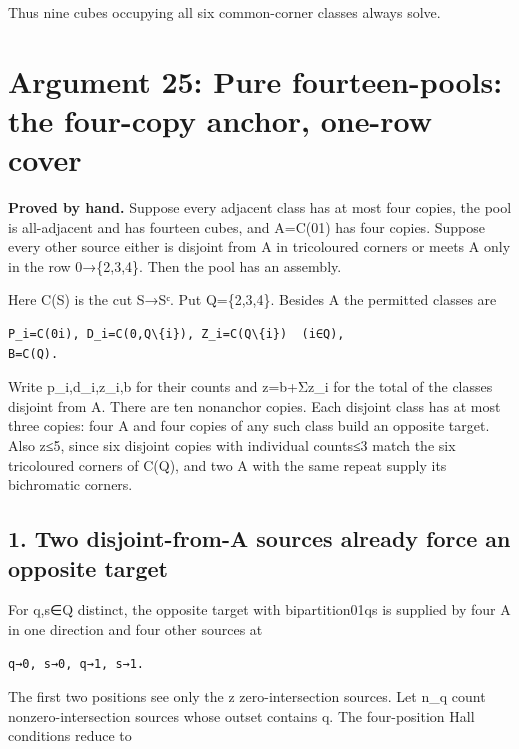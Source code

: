 \documentclass[
  10pt,
]{article}
\begin{document}
Thus nine cubes occupying all six common-corner classes always solve.

\hypertarget{arg-25}{%
\section{Argument 25: Pure fourteen-pools: the four-copy anchor, one-row
cover}\label{arg-25}}

\textbf{Proved by hand.} Suppose every adjacent class has at most four
copies, the pool is all-adjacent and has fourteen cubes, and A=C(01) has
four copies. Suppose every other source either is disjoint from A in
tricoloured corners or meets A only in the row 0→\{2,3,4\}. Then the
pool has an assembly.

Here C(S) is the cut S→Sᶜ. Put Q=\{2,3,4\}. Besides A the permitted
classes are

\begin{verbatim}
P_i=C(0i), D_i=C(0,Q\{i}), Z_i=C(Q\{i})  (i∈Q),
B=C(Q).
\end{verbatim}

Write p\_i,d\_i,z\_i,b for their counts and z=b+Σz\_i for the total of
the classes disjoint from A. There are ten nonanchor copies. Each
disjoint class has at most three copies: four A and four copies of any
such class build an opposite target. Also z≤5, since six disjoint copies
with individual counts≤3 match the six tricoloured corners of C(Q), and
two A with the same repeat supply its bichromatic corners.

\hypertarget{two-disjoint-from-a-sources-already-force-an-opposite-target}{%
\subsection*{1. Two disjoint-from-A sources already force an opposite
target}\label{two-disjoint-from-a-sources-already-force-an-opposite-target}}

For q,s∈Q distinct, the opposite target with bipartition01\textbar qs is
supplied by four A in one direction and four other sources at

\begin{verbatim}
q→0, s→0, q→1, s→1.
\end{verbatim}

The first two positions see only the z zero-intersection sources. Let
n\_q count nonzero-intersection sources whose outset contains q. The
four-position Hall conditions reduce to
\end{document}
